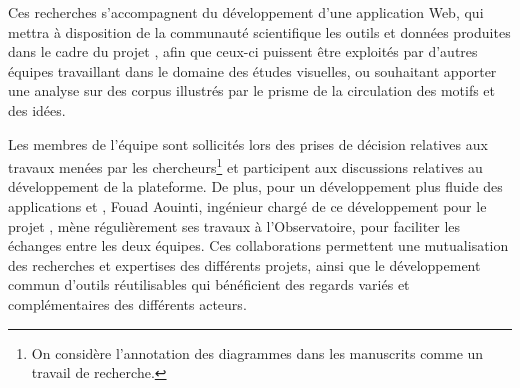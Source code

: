	Ces recherches s'accompagnent du développement d'une application Web, qui mettra à disposition de la communauté scientifique les outils et données produites dans le cadre du projet \vhs, afin que ceux-ci puissent être exploités par d'autres équipes travaillant dans le domaine des études visuelles, ou souhaitant apporter une analyse sur des corpus illustrés par le prisme de la circulation des motifs et des idées. 
	
	 Les membres de l'équipe \imagine sont sollicités lors des prises de décision relatives aux travaux menées par les chercheurs\footnote{On considère l'annotation des diagrammes dans les manuscrits comme un travail de recherche.} et participent aux discussions relatives au développement de la plateforme. De plus, pour un développement plus fluide des applications \vhs et \eida, Fouad Aouinti, ingénieur chargé de ce développement pour le projet \vhs, mène régulièrement ses travaux à l'Observatoire, pour faciliter les échanges entre les deux équipes. Ces collaborations permettent une mutualisation des recherches et expertises des différents projets, ainsi que le développement commun d'outils réutilisables qui bénéficient des regards variés et complémentaires des différents acteurs.